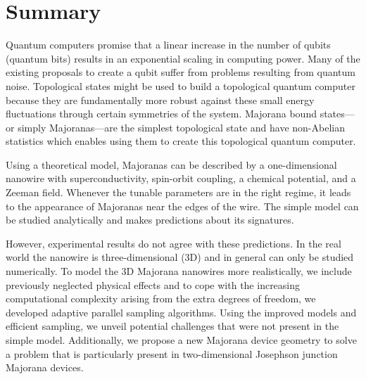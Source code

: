\chapter*{Summary}

Quantum computers promise that a linear increase in the number of qubits (quantum bits) results in an exponential scaling in computing power.
Many of the existing proposals to create a qubit suffer from problems resulting from quantum noise.
Topological states might be used to build a topological quantum computer because they are fundamentally more robust against these small energy fluctuations through certain symmetries of the system.
Majorana bound states---or simply Majoranas---are the simplest topological state and have non-Abelian statistics which enables using them to create this topological quantum computer.

Using a theoretical model, Majoranas can be described by a one-dimensional nanowire with superconductivity, spin-orbit coupling, a chemical potential, and a Zeeman field.
Whenever the tunable parameters are in the right regime, it leads to the appearance of Majoranas near the edges of the wire.
The simple model can be studied analytically and makes predictions about its signatures.

However, experimental results do not agree with these predictions.
In the real world the nanowire is three-dimensional (3D) and in general can only be studied numerically.
To model the 3D Majorana nanowires more realistically, we include previously neglected physical effects and to cope with the increasing computational complexity arising from the extra degrees of freedom, we developed adaptive parallel sampling algorithms.
Using the improved models and efficient sampling, we unveil potential challenges that were not present in the simple model.
Additionally, we propose a new Majorana device geometry to solve a problem that is particularly present in two-dimensional Josephson junction Majorana devices.

